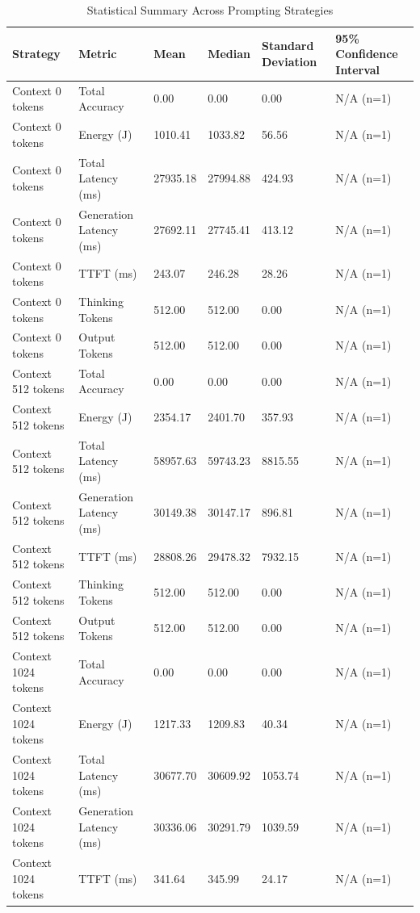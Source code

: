 \begin{table}
\caption{Statistical Summary Across Prompting Strategies}
\label{tab:statistical_summary}
\begin{tabular}{llllll}
\toprule
Strategy & Metric & Mean & Median & Standard Deviation & 95\% Confidence Interval \\
\midrule
Context 0 tokens & Total Accuracy & 0.00 & 0.00 & 0.00 & N/A (n=1) \\
Context 0 tokens & Energy (J) & 1010.41 & 1033.82 & 56.56 & N/A (n=1) \\
Context 0 tokens & Total Latency (ms) & 27935.18 & 27994.88 & 424.93 & N/A (n=1) \\
Context 0 tokens & Generation Latency (ms) & 27692.11 & 27745.41 & 413.12 & N/A (n=1) \\
Context 0 tokens & TTFT (ms) & 243.07 & 246.28 & 28.26 & N/A (n=1) \\
Context 0 tokens & Thinking Tokens & 512.00 & 512.00 & 0.00 & N/A (n=1) \\
Context 0 tokens & Output Tokens & 512.00 & 512.00 & 0.00 & N/A (n=1) \\
Context 512 tokens & Total Accuracy & 0.00 & 0.00 & 0.00 & N/A (n=1) \\
Context 512 tokens & Energy (J) & 2354.17 & 2401.70 & 357.93 & N/A (n=1) \\
Context 512 tokens & Total Latency (ms) & 58957.63 & 59743.23 & 8815.55 & N/A (n=1) \\
Context 512 tokens & Generation Latency (ms) & 30149.38 & 30147.17 & 896.81 & N/A (n=1) \\
Context 512 tokens & TTFT (ms) & 28808.26 & 29478.32 & 7932.15 & N/A (n=1) \\
Context 512 tokens & Thinking Tokens & 512.00 & 512.00 & 0.00 & N/A (n=1) \\
Context 512 tokens & Output Tokens & 512.00 & 512.00 & 0.00 & N/A (n=1) \\
Context 1024 tokens & Total Accuracy & 0.00 & 0.00 & 0.00 & N/A (n=1) \\
Context 1024 tokens & Energy (J) & 1217.33 & 1209.83 & 40.34 & N/A (n=1) \\
Context 1024 tokens & Total Latency (ms) & 30677.70 & 30609.92 & 1053.74 & N/A (n=1) \\
Context 1024 tokens & Generation Latency (ms) & 30336.06 & 30291.79 & 1039.59 & N/A (n=1) \\
Context 1024 tokens & TTFT (ms) & 341.64 & 345.99 & 24.17 & N/A (n=1) \\

\end{tabular}
\end{table}
